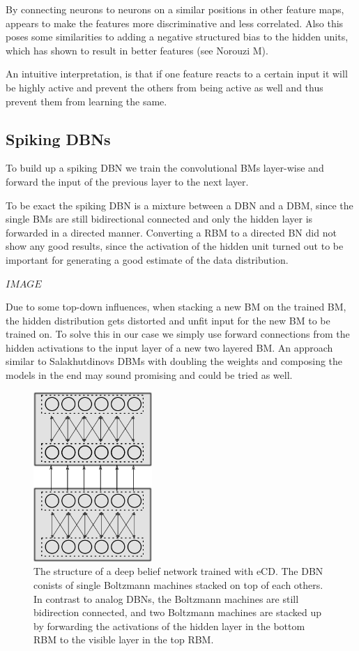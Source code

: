 By connecting neurons to neurons on a similar positions in other feature maps, appears to make the features more discriminative and less correlated.
Also this poses some similarities to adding a negative structured bias to the hidden units, which has shown to result in better features (see Norouzi M).

An intuitive interpretation, is that if one feature reacts to a certain input it will be highly active and prevent the others from being active as well and thus prevent them from learning the same.  

\subsection{Spiking DBNs}

To build up a spiking DBN we train the convolutional BMs layer-wise and forward the input of the previous layer to the next layer.

To be exact the spiking DBN is a mixture between a DBN and a DBM, since the single BMs are still bidirectional connected and only the hidden layer is forwarded in a directed manner.
Converting a RBM to a directed BN did not show any good results, since the activation of the hidden unit turned out to be important for generating a good estimate of the data distribution. 

$IMAGE$

Due to some top-down influences, when stacking a new BM on the trained BM, the hidden distribution gets distorted and unfit input for the new BM to be trained on. 
To solve this in our case we simply use forward connections from the hidden activations to the input layer of a new two layered BM. 
An approach similar to Salakhutdinovs DBMs with doubling the weights and composing the models in the end may sound promising and could be tried as well.

\begin{figure}
	\centering
    	\includegraphics[width=0.4\textwidth]{imgs/spike_dbn.png} 
    \caption{The structure of a deep belief network trained with eCD. The DBN conists of single Boltzmann machines stacked on top of each others. In contrast to analog DBNs, the Boltzmann machines are still bidirection connected, and two Boltzmann machines are stacked up by forwarding the activations of the hidden layer in the bottom RBM to the visible layer in the top RBM.}
	\label{fig:spikedbn}
\end{figure}

